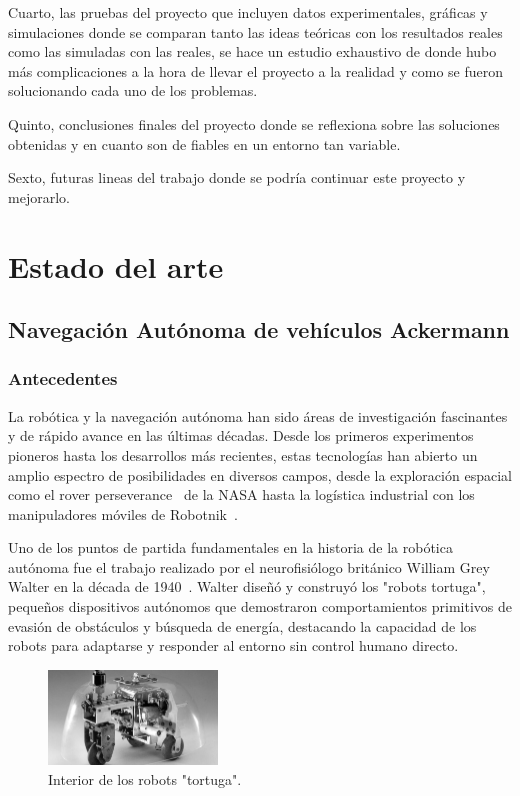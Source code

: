 Cuarto, las pruebas del proyecto que incluyen datos experimentales, gráficas y simulaciones donde se comparan tanto las ideas teóricas con 
los resultados reales como las simuladas con las reales, se hace un estudio exhaustivo de donde hubo más complicaciones a la hora de llevar 
el proyecto a la realidad y como se fueron solucionando cada uno de los problemas.

Quinto, conclusiones finales del proyecto donde se reflexiona sobre las soluciones obtenidas y en cuanto son de fiables en un entorno tan 
variable.

Sexto, futuras lineas del trabajo donde se podría continuar este proyecto y mejorarlo.

\chapter{Estado del arte}
\section{Navegación Autónoma de vehículos Ackermann}
\subsection{Antecedentes}
La robótica y la navegación autónoma han sido áreas de investigación fascinantes y de rápido avance en las últimas décadas. 
Desde los primeros experimentos pioneros hasta los desarrollos más recientes, estas tecnologías han abierto un amplio espectro de 
posibilidades en diversos campos, desde la exploración espacial como el rover perseverance~\Cite{nasa24} de la NASA hasta la logística 
industrial con los manipuladores móviles de Robotnik~\Cite{robotnik24}.

Uno de los puntos de partida fundamentales en la historia de la robótica autónoma fue el trabajo realizado por el neurofisiólogo británico 
William Grey Walter en la década de 1940~\cite{holland2003first}. Walter diseñó y construyó los "robots tortuga", pequeños dispositivos 
autónomos que demostraron comportamientos primitivos de evasión de obstáculos y búsqueda de energía, destacando la capacidad de los robots 
para adaptarse y responder al entorno sin control humano directo.

\begin{figure}[h]
    \centering
    \includegraphics[width=0.4\textwidth]{images/tortugas_william_grey.jpg}
    \caption{Interior de los robots "tortuga".}
    \label{fig:tortugas_grey}
\end{figure}


